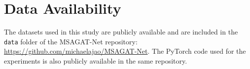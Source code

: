 \documentclass[a4paper,fleqn]{cas-dc}
\begin{document}
\section*{Data Availability}

The datasets used in this study are publicly available and are included in the \texttt{data} folder of the MSAGAT-Net repository: \url{https://github.com/michaelajao/MSAGAT-Net}. The PyTorch code used for the experiments is also publicly available in the same repository.

\printcredits




\end{document}

